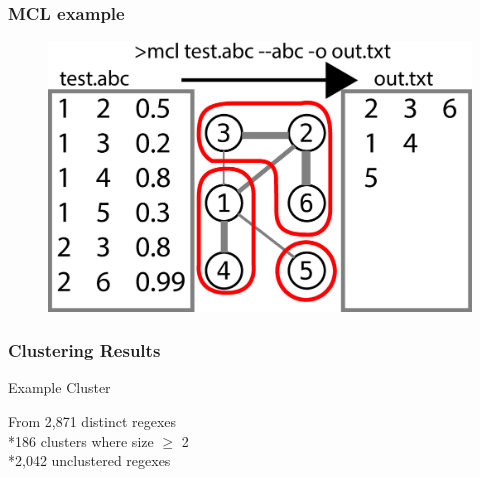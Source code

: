 \begin{frame}
\frametitle{MCL example}
\begin{figure}[ht]
  \centering
  \includegraphics[scale=0.24]{nontex/illustrations/mclExample.eps}
  \label{fig:mclExample}
\end{figure}
\end{frame}


\begin{frame}[fragile]
\frametitle{Clustering Results}
\begin{center}
Example Cluster
\end{center}

\begin{center}
From 2,871 distinct regexes
\\*186 clusters where size $\geq$ 2
\\*2,042 unclustered regexes
\end{center}
\end{frame}




